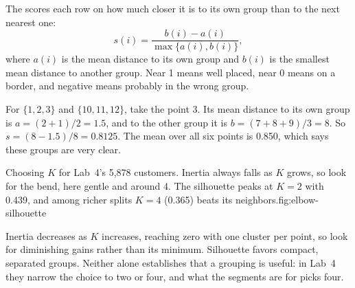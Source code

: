 The  scores each row on how much closer it is to its own group than to the next nearest one:
\[
  s(i)=\frac{b(i)-a(i)}{\max\{a(i),b(i)\}},
\]
where $a(i)$ is the mean distance to its own group and $b(i)$ is the smallest mean distance to another group. Near 1 means well placed, near 0 means on a border, and negative means probably in the wrong group.

\begin{workedexample}
For $\{1,2,3\}$ and $\{10,11,12\}$, take the point 3. Its mean distance to its own group is $a=(2+1)/2=1.5$, and to the other group it is $b=(7+8+9)/3=8$. So $s=(8-1.5)/8=0.8125$. The mean over all six points is 0.850, which says these groups are very clear.
\end{workedexample}

\begin{utpfig}{Choosing $K$ for Lab~4's 5,878 customers. Inertia always falls as $K$ grows, so look for the bend, here gentle and around 4. The silhouette peaks at $K=2$ with 0.439, and among richer splits $K=4$ (0.365) beats its neighbors.}{fig:elbow-silhouette}
\end{utpfig}

\begin{intuition}
Inertia decreases as $K$ increases, reaching zero with one cluster per point, so look for diminishing gains rather than its minimum. Silhouette favors compact, separated groups. Neither alone establishes that a grouping is useful: in Lab~4 they narrow the choice to two or four, and what the segments are for picks four.
\end{intuition}

